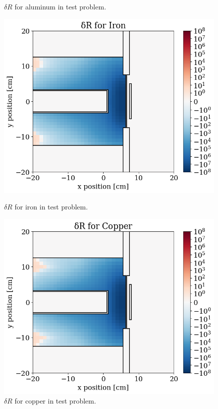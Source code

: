 \begin{figure}
\begin{minipage}{0.495\linewidth}
    \caption{$\delta R$ for aluminum in test problem.}
    \label{fig:tp:dR_02}
  \end{minipage}
  \begin{minipage}{0.495\linewidth}
    \centering
    \includegraphics[width=\linewidth]{content/testprob/dR_10.png}
    \caption{$\delta R$ for iron in test problem.}
    \label{fig:tp:dR_10}
  \end{minipage}
  \hfill
  \begin{minipage}{0.495\linewidth}
    \centering
    \includegraphics[width=\linewidth]{content/testprob/dR_08.png}
    \caption{$\delta R$ for copper in test problem.}
    \label{fig:tp:dR_08}
  \end{minipage}
\end{figure}


